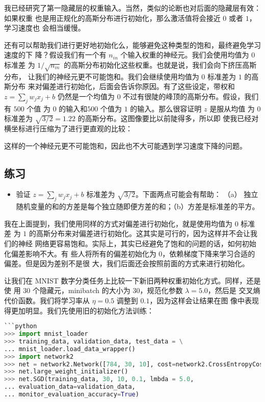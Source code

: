 我已经研究了第一隐藏层的权重输入。当然，类似的论断也对后面的隐藏层有效：如果权重
也是用正规化的高斯分布进行初始化，那么激活值将会接近 $0$ 或者 $1$，学习速度也
会相当缓慢。

还有可以帮助我们进行更好地初始化么，能够避免这种类型的饱和，最终避免学习速度的下
降？假设我们有一个有 $n_{in}$ 个输入权重的神经元。我们会使用均值为 $0$ 标准差
为 $1/\sqrt{n_{in}}$ 的高斯分布初始化这些权重。也就是说，我们会向下挤压高斯分布，
让我们的神经元更不可能饱和。我们会继续使用均值为 $0$ 标准差为 $1$ 的高斯分布
来对偏差进行初始化，后面会告诉你原因。有了这些设定，带权和 $z=\sum_j w_j x_j +
b$ 仍然是一个均值为 $0$ 不过有很陡的峰顶的高斯分布。假设，我们有 $500$ 个值
为 $0$ 的输入和$500$ 个值为 $1$ 的输入。那么很容证明 $z$ 是服从均值
为 $0$ 标准差为 $\sqrt{3/2} = 1.22$ 的高斯分布。这图像要比以前陡得多，所以即
使我已经对横坐标进行压缩为了进行更直观的比较：

这样的一个神经元更不可能饱和，因此也不大可能遇到学习速度下降的问题。

\subsection*{练习}

\begin{itemize}
\item 验证 $z=\sum_j w_j x_j + b$ 标准差为 $\sqrt{3/2}$。下面两点可能会有帮助：
  （a） 独立随机变量的和的方差是每个独立随即便方差的和；（b）方差是标准差的平方。
\end{itemize}

我在上面提到，我们使用同样的方式对偏差进行初始化，就是使用均值为 $0$ 标准差
为 $1$ 的高斯分布来对偏差进行初始化。这其实是可行的，因为这样并不会让我们的神经
网络更容易饱和。实际上，其实已经避免了饱和的问题的话，如何初始化偏差影响不大。有
些人将所有的偏差初始化为 $0$，依赖梯度下降来学习合适的偏差。但是因为差别不是很
大，我们后面还会按照前面的方式来进行初始化。

让我们在 MNIST 数字分类任务上比较一下新旧两种权重初始化方式。同样，还是使
用 $30$ 个隐藏元，minibatch 的大小为 $30$，规范化参数 $\lambda=5.0$，然后是
交叉熵代价函数。我们将学习率从 $\eta=0.5$ 调整到 $0.1$，因为这样会让结果在图
像中表现得更加明显。我们先使用旧的初始化方法训练：

\begin{lstlisting}[language=Python]
```python
>>> import mnist_loader
>>> training_data, validation_data, test_data = \
... mnist_loader.load_data_wrapper()
>>> import network2
>>> net = network2.Network([784, 30, 10], cost=network2.CrossEntropyCost)
>>> net.large_weight_initializer()
>>> net.SGD(training_data, 30, 10, 0.1, lmbda = 5.0,
... evaluation_data=validation_data, 
... monitor_evaluation_accuracy=True)
\end{lstlisting}

